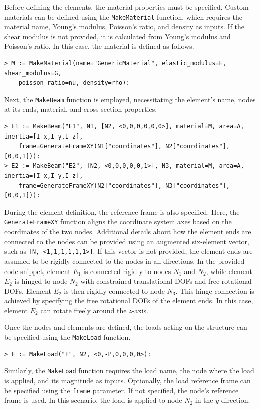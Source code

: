 Before defining the elements, the material properties must be specified. Custom materials can be defined using the \texttt{MakeMaterial} function, which requires the material name, Young's modulus, Poisson's ratio, and density as inputs. If the shear modulus is not provided, it is calculated from Young's modulus and Poisson's ratio. In this case, the material is defined as follows.
%
\begin{verbatim}
> M := MakeMaterial(name="GenericMaterial", elastic_modulus=E, shear_modulus=G,
    poisson_ratio=nu, density=rho):
\end{verbatim}
%
Next, the \texttt{MakeBeam} function is employed, necessitating the element's name, nodes at its ends, material, and cross-section properties.
%
\begin{verbatim}
> E1 := MakeBeam("E1", N1, [N2, <0,0,0,0,0,0>], material=M, area=A, inertia=[I_x,I_y,I_z],
    frame=GenerateFrameXY(N1["coordinates"], N2["coordinates"], [0,0,1])):
> E2 := MakeBeam("E2", [N2, <0,0,0,0,0,1>], N3, material=M, area=A, inertia=[I_x,I_y,I_z],
    frame=GenerateFrameXY(N2["coordinates"], N3["coordinates"], [0,0,1])):
\end{verbatim}
%
During the element definition, the reference frame is also specified. Here, the \texttt{GenerateFrameXY} function aligns the coordinate system axes based on the coordinates of the two nodes. Additional details about how the element ends are connected to the nodes can be provided using an augmented six-element vector, such as \texttt{[N, <1,1,1,1,1,1>]}. If this vector is not provided, the element ends are assumed to be rigidly connected to the nodes in all directions. In the provided code snippet, element $E_1$ is connected rigidly to nodes $N_1$ and $N_2$, while element $E_2$ is hinged to node $N_2$ with constrained translational \acp{DOF} and free rotational \acp{DOF}. Element $E_2$ is then rigidly connected to node $N_3$. This hinge connection is achieved by specifying the free rotational \acp{DOF} of the element ends. In this case, element $E_2$ can rotate freely around the $z$-axis.

Once the nodes and elements are defined, the loads acting on the structure can be specified using the \texttt{MakeLoad} function.
%
\begin{verbatim}
> F := MakeLoad("F", N2, <0,-P,0,0,0,0>):
\end{verbatim}
%
Similarly, the \texttt{MakeLoad} function requires the load name, the node where the load is applied, and its magnitude as inputs. Optionally, the load reference frame can be specified using the \texttt{frame} parameter. If not specified, the node's reference frame is used. In this scenario, the load is applied to node $N_2$ in the $y$-direction.

